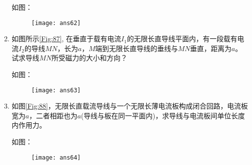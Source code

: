 \begin{enumerate}
    \begin{solution}
        如图：
        \begin{figure}[H]
            \centering
            \texttt{[image: ans62]}
        \end{figure}
    \end{solution}
    \item 如图所示\ref{Fig:87}, 在垂直于载有电流$I_1$的无限长直导线平面内，有一段载有电流$I_2$的导线$MN$，长为$a$，$M$端到无限长直导线的垂线与$MN$垂直，距离为$a$。试求导线$MN$所受磁力的大小和方向？
    \begin{solution}
        如图：
        \begin{figure}[H]
            \centering
            \texttt{[image: ans63]}
        \end{figure}
    \end{solution}
    \item 如图\ref{Fig:88}，无限长直载流导线与一个无限长薄电流板构成闭合回路，电流板宽为$a$，二者相距也为$a$(导线与板在同一平面内)，求导线与电流板间单位长度内作用力。
    \begin{solution}
        如图：
        \begin{figure}[H]
            \centering
            \texttt{[image: ans64]}
        \end{figure}
    \end{solution}
\end{enumerate}